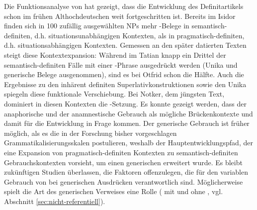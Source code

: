 Die Funktionsanalyse von  hat gezeigt, dass die Entwicklung des Definitartikels schon im frühen Althochdeutschen weit fortgeschritten ist. Bereits im Isidor finden sich in 100 zufällig ausgewählten NPs mehr -Belege in semantisch-definiten, d.h. situationsunabhängigen Kontexten, als in pragmatisch-definiten, d.h. situationsabhängigen Kontexten. Gemessen an den später datierten Texten steigt diese Kontextexpansion: Während im Tatian knapp ein Drittel der se\-man\-tisch-definiten Fälle mit einer -Phrase ausgedrückt werden (Unika und generische Belege ausgenommen), sind es bei Otfrid schon die Hälfte. Auch die Ergebnisse zu den inhärent definiten Superlativkonstruktionen sowie den Unika spiegeln diese funktionale Verschiebung. Bei Notker, dem jüngsten Text, dominiert in diesen Kontexten die -Setzung. Es konnte gezeigt werden, dass der anaphorische und der anamnestische Gebrauch als mögliche Brückenkontexte und damit  für die Entwicklung in Frage kommen. Der generische Gebrauch ist früher möglich, als es die in der Forschung bisher vorgeschlagen Grammatikalisierungsskalen postulieren, weshalb der Hauptentwicklungspfad, der eine Expansion von pragmatisch-definiten Kontexten zu semantisch-definiten Gebrauchskontexten vorsieht, um einen generischen  erweitert wurde. Es bleibt zukünftigen Studien überlassen, die Faktoren offenzulegen, die für den variablen Gebrauch von  bei generischen Ausdrücken verantwortlich sind. Möglicherweise spielt die Art des generischen Verweises eine Rolle ( mit und ohne , vgl. Abschnitt \ref{sec:nicht-referentiell}). 

